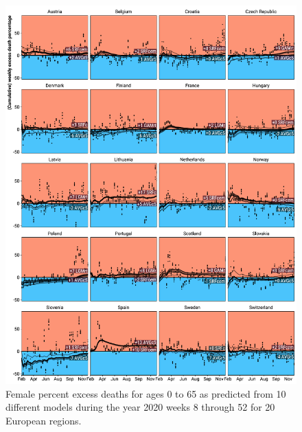 \documentclass[12pt]{article}
\begin{document}
\begin{appendix}
\begin{figure}
\caption{
Female percent excess deaths for ages 0 to 65 as predicted from 10 different models during the year 2020 weeks 8 through 52 for 20 European regions.}
\label{fig:excessf0to65}
\includegraphics{excess_female__0_65_.pdf}
\end{figure}


\end{appendix}
\end{document}
